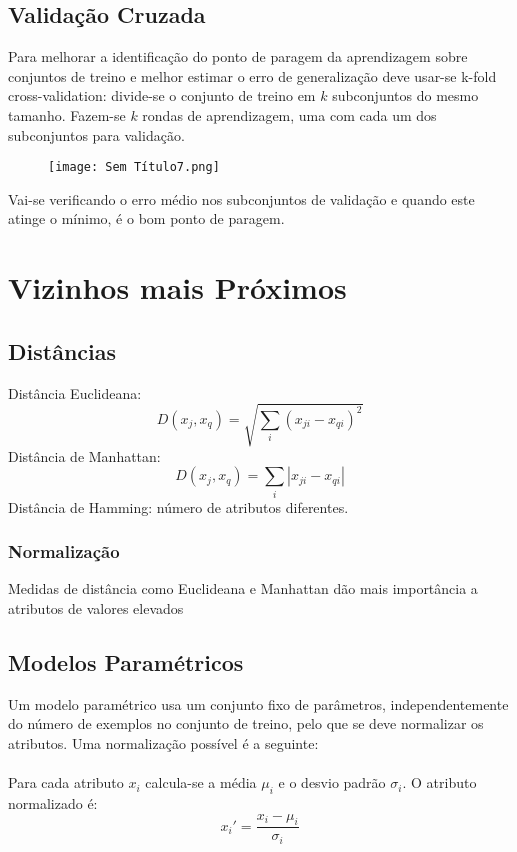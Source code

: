 \documentclass[10pt,a4paper]{report}
\begin{document}
\subsection{Validação Cruzada}
Para melhorar a identificação do ponto de paragem da aprendizagem sobre conjuntos de treino e melhor estimar o erro de generalização deve usar-se k-fold cross-validation: divide-se o conjunto de treino em $k$ subconjuntos do mesmo tamanho. Fazem-se $k$ rondas de aprendizagem, uma com cada um dos subconjuntos para validação.
\begin{figure}[H]
\centering
\texttt{[image: Sem Título7.png]}
\end{figure}
Vai-se verificando o erro médio nos subconjuntos de validação e quando este atinge o mínimo, é o bom ponto de paragem.
\section{Vizinhos mais Próximos}
\subsection{Distâncias}
Distância Euclideana:
$$
D(x_j,x_q) = \sqrt{\sum_i(x_{ji} - x_{qi})^2}
$$
Distância de Manhattan:
$$
D(x_j,x_q) = \sum_i|x_{ji} - x_{qi}|
$$
Distância de Hamming: número de atributos diferentes.
\subsubsection{Normalização}
Medidas de distância como Euclideana e Manhattan dão mais importância a atributos de valores elevados
\subsection{Modelos Paramétricos}
Um modelo paramétrico usa um conjunto fixo de parâmetros, independentemente do número de exemplos no conjunto de treino, pelo que se deve normalizar os atributos. Uma normalização possível é a seguinte:\\
\\
Para cada atributo $x_i$ calcula-se a média $\mu_i$ e o desvio padrão $\sigma_i$. O atributo normalizado é:
$$
x_i' = \frac{x_i - \mu_i}{\sigma_i}
$$
\end{document}
